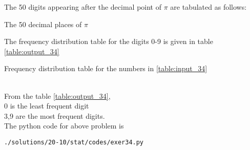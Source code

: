 The 50 digits appearing after the decimal point of $\pi$ are tabulated as follows:\\
\begin{table}[ht!]
\centering

\caption{The 50 decimal places of $\pi$}
\label{table:input_34}
\end{table}
The frequency distribution table for the digits 0-9 is given in table \ref{table:output_34}
\begin{table}[ht!]
\centering

\caption{Frequency distribution table for the numbers in \ref{table:input_34}}
\label{table:output_34}
\end{table}
\\From the table \ref{table:output_34},\\
0 is the least frequent digit \\
3,9 are the most frequent digits.\\
The python code for above problem is 
\begin{lstlisting}
./solutions/20-10/stat/codes/exer34.py
\end{lstlisting}

